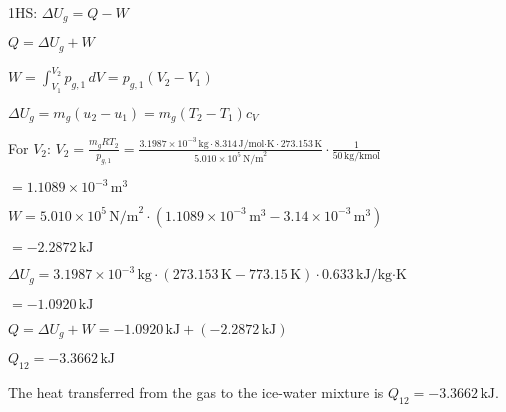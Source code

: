 1HS: \( \Delta U_g = Q - W \)  

\( Q = \Delta U_g + W \)  

\( W = \int_{V_1}^{V_2} p_{g,1} \, dV = p_{g,1} (V_2 - V_1) \)  

\( \Delta U_g = m_g (u_2 - u_1) = m_g (T_2 - T_1) c_V \)  

For \( V_2 \):  
\( V_2 = \frac{m_g R T_2}{p_{g,1}} = \frac{3.1987 \times 10^{-3} \, \text{kg} \cdot 8.314 \, \text{J/mol·K} \cdot 273.153 \, \text{K}}{5.010 \times 10^5 \, \text{N/m}^2} \cdot \frac{1}{50 \, \text{kg/kmol}} \)  

\( = 1.1089 \times 10^{-3} \, \text{m}^3 \)  

\( W = 5.010 \times 10^5 \, \text{N/m}^2 \cdot (1.1089 \times 10^{-3} \, \text{m}^3 - 3.14 \times 10^{-3} \, \text{m}^3) \)  

\( = -2.2872 \, \text{kJ} \)  

\( \Delta U_g = 3.1987 \times 10^{-3} \, \text{kg} \cdot (273.153 \, \text{K} - 773.15 \, \text{K}) \cdot 0.633 \, \text{kJ/kg·K} \)  

\( = -1.0920 \, \text{kJ} \)  

\( Q = \Delta U_g + W = -1.0920 \, \text{kJ} + (-2.2872 \, \text{kJ}) \)  

\( Q_{12} = -3.3662 \, \text{kJ} \)  

The heat transferred from the gas to the ice-water mixture is \( Q_{12} = -3.3662 \, \text{kJ} \).